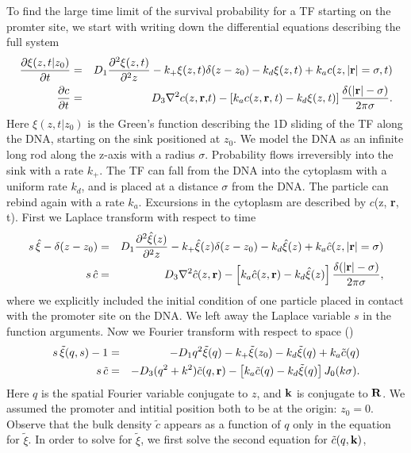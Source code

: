 To find the large time limit of the survival probability for a TF starting on the promter site, we start with writing down the differential equations describing the full system
\setlength{\jot}{12pt}
\begin{eqnarray*}
 \frac{\partial \xi(z,t|z_0)}{\partial t} & = & D_1 \frac{\partial^2\xi(z,t)}{\partial^2 z} - k_+ \xi(z,t) \delta(z - z_0) - k_d \xi(z,t) + k_a c(z, |{\bf r}| = \sigma, t) \\
 \frac{\partial c}{\partial t} & = & D_3 \nabla^2 c(z, \mathbf r \mathrm, t) - \left[ k_a c(z, \bf r \it, t) - k_d \xi(z,t) \right] \frac{\delta(|\mathbf r \mathrm| - \sigma)}{2 \pi \sigma}.
\end{eqnarray*}
Here $\xi(z, t|z_0)$ is the Green's function describing the 1D sliding of the TF along the DNA, starting on the sink positioned at $z_0$. We model the DNA as an infinite long rod along the z-axis with a radius $\sigma$. Probability flows irreversibly into the sink with a rate $k_+$. The TF can fall from the DNA into the cytoplasm with a uniform rate $k_d$, and is placed at a distance $\sigma$ from the DNA. The particle can rebind again with a rate $k_a$. Excursions in the cytoplasm are described by $c$(z, {\bf r}, t). First we Laplace transform with respect to time
\begin{eqnarray*}
 s \, \hat{\xi} - \delta(z - z_0) & = & D_1 \frac{\partial^2\hat{\xi}(z)}{\partial^2 z} - k_+ \hat{\xi}(z) \delta(z - z_0) - k_d \hat{\xi}(z) + k_a \hat{c}(z, |{\bf r}| = \sigma) \\
 s \, \hat{c} & = & D_3 \nabla^2 \hat{c}(z, \mathbf r \mathrm) - \left[ k_a \hat{c}(z, \mathbf r \mathrm) - k_d \hat{\xi}(z) \right] \frac{\delta(|\mathbf r \mathrm| - \sigma)}{2 \pi \sigma},
\end{eqnarray*}
where we explicitly included the initial condition of one particle placed in contact with the promoter site on the DNA. We left away the Laplace variable $s$ in the function arguments. Now we Fourier transform with respect to space ()
\begin{eqnarray}
 s \, \tilde{\xi}(q, s) - 1 & = & - D_1 q^2 \tilde{\xi}(q) - k_+ \tilde{\xi}(z_0) - k_d \tilde{\xi}(q) + k_a \tilde{c}(q) \elabel{FDE_dna} \\
 s \, \tilde{c} & = & - D_3 (q^2 + k^2) \tilde{c}(q, \mathbf r \mathrm) - \left[ k_a \tilde{c}(q) - k_d \tilde{\xi}(q) \right] J_{0}(k \sigma). 
 \elabel{FDE_bulk}
\end{eqnarray}
Here $q$ is the spatial Fourier variable conjugate to $z$, and $\bf k \rm$ is conjugate to $\bf R \bf$. We assumed the promoter and intitial position both to be at the origin: $z_0 = 0$. Observe that the bulk density $\tilde{c}$ appears as a function of $q$ only in the equation for $\tilde{\xi}$. In order to solve for $\tilde{\xi}$, we first solve the second equation for $\tilde{c}(q,\bf k \rm)$, 
